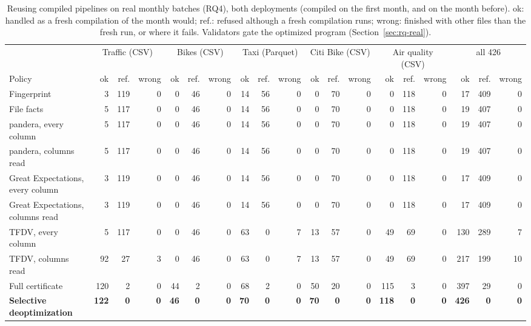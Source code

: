 \begin{table}[t]
\caption{Reusing compiled pipelines on real monthly batches (RQ4), both deployments (compiled on the first month, and on the month before). ok: handled as a fresh compilation of the month would; ref.: refused although a fresh compilation runs; wrong: finished with other files than the fresh run, or where it fails. Validators gate the optimized program (Section~\ref{sec:rq-real}).}
\label{tab:rq-real}
\centering
\footnotesize
\begin{adjustbox}{max width=\linewidth}
\begin{tabular}{@{}lrrrrrrrrrrrrrrrrrr@{}}
\toprule
& \multicolumn{3}{c}{Traffic (CSV)} & \multicolumn{3}{c}{Bikes (CSV)} & \multicolumn{3}{c}{Taxi (Parquet)} & \multicolumn{3}{c}{Citi Bike (CSV)} & \multicolumn{3}{c}{Air quality (CSV)} & \multicolumn{3}{c}{all 426} \\
\cmidrule(l){2-4}\cmidrule(l){5-7}\cmidrule(l){8-10}\cmidrule(l){11-13}\cmidrule(l){14-16}\cmidrule(l){17-19}
Policy & ok & ref. & wrong & ok & ref. & wrong & ok & ref. & wrong & ok & ref. & wrong & ok & ref. & wrong & ok & ref. & wrong \\
\midrule
Fingerprint & 3 & 119 & 0 & 0 & 46 & 0 & 14 & 56 & 0 & 0 & 70 & 0 & 0 & 118 & 0 & 17 & 409 & 0 \\
File facts & 5 & 117 & 0 & 0 & 46 & 0 & 14 & 56 & 0 & 0 & 70 & 0 & 0 & 118 & 0 & 19 & 407 & 0 \\
pandera, every column & 5 & 117 & 0 & 0 & 46 & 0 & 14 & 56 & 0 & 0 & 70 & 0 & 0 & 118 & 0 & 19 & 407 & 0 \\
pandera, columns read & 5 & 117 & 0 & 0 & 46 & 0 & 14 & 56 & 0 & 0 & 70 & 0 & 0 & 118 & 0 & 19 & 407 & 0 \\
Great Expectations, every column & 3 & 119 & 0 & 0 & 46 & 0 & 14 & 56 & 0 & 0 & 70 & 0 & 0 & 118 & 0 & 17 & 409 & 0 \\
Great Expectations, columns read & 3 & 119 & 0 & 0 & 46 & 0 & 14 & 56 & 0 & 0 & 70 & 0 & 0 & 118 & 0 & 17 & 409 & 0 \\
TFDV, every column & 5 & 117 & 0 & 0 & 46 & 0 & 63 & 0 & 7 & 13 & 57 & 0 & 49 & 69 & 0 & 130 & 289 & 7 \\
TFDV, columns read & 92 & 27 & 3 & 0 & 46 & 0 & 63 & 0 & 7 & 13 & 57 & 0 & 49 & 69 & 0 & 217 & 199 & 10 \\
Full certificate & 120 & 2 & 0 & 44 & 2 & 0 & 68 & 2 & 0 & 50 & 20 & 0 & 115 & 3 & 0 & 397 & 29 & 0 \\
\textbf{Selective deoptimization} & \textbf{122} & \textbf{0} & \textbf{0} & \textbf{46} & \textbf{0} & \textbf{0} & \textbf{70} & \textbf{0} & \textbf{0} & \textbf{70} & \textbf{0} & \textbf{0} & \textbf{118} & \textbf{0} & \textbf{0} & \textbf{426} & \textbf{0} & \textbf{0} \\
\bottomrule
\end{tabular}
\end{adjustbox}
\end{table}
